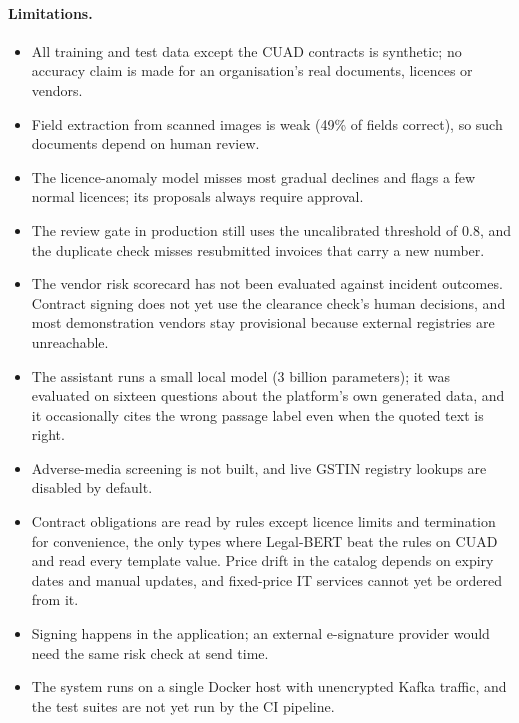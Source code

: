 \paragraph{Limitations.}
\begin{itemize}
  \item All training and test data except the CUAD contracts is synthetic; no accuracy claim is made for an organisation's real documents, licences or vendors.
  \item Field extraction from scanned images is weak (49\% of fields correct), so such documents depend on human review.
  \item The licence-anomaly model misses most gradual declines and flags a few normal licences; its proposals always require approval.
  \item The review gate in production still uses the uncalibrated threshold of 0.8, and the duplicate check misses resubmitted invoices that carry a new number.
  \item The vendor risk scorecard has not been evaluated against incident outcomes. Contract signing does not yet use the clearance check's human decisions, and most demonstration vendors stay provisional because external registries are unreachable.
  \item The assistant runs a small local model (3 billion parameters); it was evaluated on sixteen questions about the platform's own generated data, and it occasionally cites the wrong passage label even when the quoted text is right.
  \item Adverse-media screening is not built, and live GSTIN registry lookups are disabled by default.
  \item Contract obligations are read by rules except licence limits and termination for convenience, the only types where Legal-BERT beat the rules on CUAD and read every template value. Price drift in the catalog depends on expiry dates and manual updates, and fixed-price IT services cannot yet be ordered from it.
  \item Signing happens in the application; an external e-signature provider would need the same risk check at send time.
  \item The system runs on a single Docker host with unencrypted Kafka traffic, and the test suites are not yet run by the CI pipeline.
\end{itemize}

